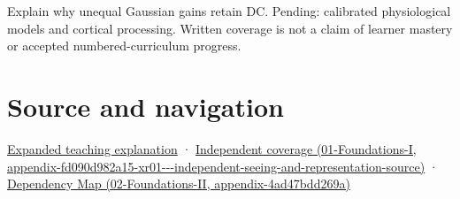 Explain why unequal Gaussian gains retain DC. Pending: calibrated physiological models and cortical processing. Written coverage is not a claim of learner mastery or accepted numbered-curriculum progress.

\section{Source and navigation}\label{appendix-7281c15ac44a-source-and-navigation}

\href{Continuous\%20Notes/University\%20-\%20Worlds,\%20Images\%20and\%20Inference\%20-\%20Graphics,\%20Vision\%20and\%20Photography\#The\%20eye\%20is\%20an\%20optical\%20instrument\%20with\%20neural\%20processing\%20inside\%20it}{Expanded teaching explanation} · \href{../01-Foundations-I/main.pdf\#nameddest=appendix-fd090d982a15-xr01---independent-seeing-and-representation-source}{Independent coverage (01-Foundations-I, appendix-fd090d982a15-xr01-\/-\/-independent-seeing-and-representation-source)} · \href{../02-Foundations-II/main.pdf\#nameddest=appendix-4ad47bdd269a}{Dependency Map (02-Foundations-II, appendix-4ad47bdd269a)}
